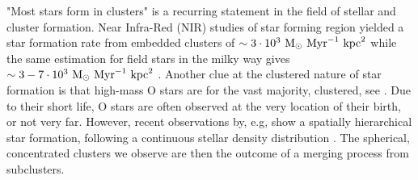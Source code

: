 "Most stars form in clusters" is a recurring statement in the field of stellar and cluster formation. Near Infra-Red (NIR) studies of star forming region yielded a star formation rate from embedded clusters of $\sim 3\cdot10^3~{\textrm{M}_\odot} ~\textrm{Myr}^{-1}~ \textrm{kpc}^2$ \citep{Lada2003} while the same estimation for field stars in the milky way gives $\sim3-7\cdot10^3~{\textrm{M}_\odot}~\textrm{Myr}^{-1}~\textrm{kpc}^2$ \citep{Miller1979}. Another clue at the clustered nature of star formation is that high-mass O stars are for the vast majority, clustered, see \cite{DeWit2005}. Due to their short life, O stars are often observed at the very location of their birth, or not very far. However, recent observations by, e.g,  \cite{Gutermuth2011} show a spatially hierarchical star formation, following a continuous stellar density distribution \citep{Bressert2010}. The spherical, concentrated clusters we observe are then the outcome of a merging process from subclusters. 




%


%


